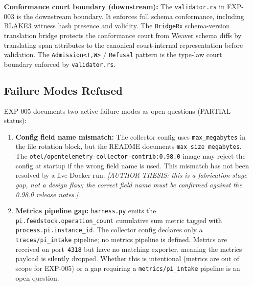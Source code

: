\textbf{Conformance court boundary (downstream):} The \texttt{validator.rs} in EXP-003 is the
downstream boundary. It enforces full schema conformance, including BLAKE3 witness hash
presence and validity. The \texttt{BridgeRx} schema-version translation bridge protects the
conformance court from Weaver schema diffs by translating span attributes to the canonical
court-internal representation before validation. The \texttt{Admission\textless T,W\textgreater}
/ \texttt{Refusal} pattern is the type-law court boundary enforced by \texttt{validator.rs}.

\subsection{Failure Modes Refused}
\label{sec:otel-weaver-exp-005-collector-to-intake-architecture-failures}

EXP-005 documents two active failure modes as open questions (PARTIAL status):

\begin{enumerate}
  \item \textbf{Config field name mismatch:} The collector config uses \texttt{max\_megabytes}
        in the file rotation block, but the README documents \texttt{max\_size\_megabytes}.
        The \texttt{otel/opentelemetry-collector-contrib:0.98.0} image may reject the config
        at startup if the wrong field name is used. This mismatch has not been resolved by a
        live Docker run. \textit{[AUTHOR THESIS: this is a fabrication-stage gap, not a
        design flaw; the correct field name must be confirmed against the 0.98.0 release
        notes.]}

  \item \textbf{Metrics pipeline gap:} \texttt{harness.py} emits the
        \texttt{pi.feedstock.operation\_count} cumulative sum metric tagged with
        \texttt{process.pi.instance\_id}. The collector config declares only a
        \texttt{traces/pi\_intake} pipeline; no metrics pipeline is defined. Metrics are
        received on port~\texttt{4318} but have no matching exporter, meaning the metrics
        payload is silently dropped. Whether this is intentional (metrics are out of scope
        for EXP-005) or a gap requiring a \texttt{metrics/pi\_intake} pipeline is an open
        question.
\end{enumerate}
